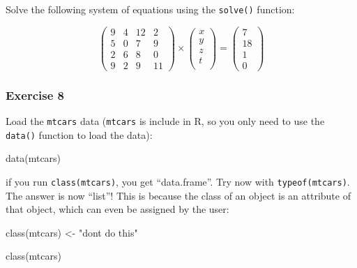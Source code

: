 \documentclass[
]{article}
\newenvironment{Shaded}{\begin{snugshade}}{\end{snugshade}}
\newcommand{\FunctionTok}[1]{\textcolor[rgb]{0.00,0.00,0.00}{#1}}
\newcommand{\NormalTok}[1]{#1}
\newcommand{\OtherTok}[1]{\textcolor[rgb]{0.56,0.35,0.01}{#1}}
\newcommand{\StringTok}[1]{\textcolor[rgb]{0.31,0.60,0.02}{#1}}
\begin{document}
Solve the following system of equations using the \texttt{solve()} function:

\[
\left(
\begin{array}{cccc}
 9 & 4 & 12 & 2 \\
 5 & 0 & 7 & 9\\
 2 & 6 & 8 & 0\\
 9 & 2 & 9 & 11
\end{array} \right) \times \left(
\begin{array}{ccc}
 x \\
 y \\
 z \\
 t \\
\end{array}\right) =
\left(
\begin{array}{ccc}
7\\
18\\
1\\
0
\end{array}
\right)
\]

\hypertarget{exercise-8}{%
\subsubsection*{Exercise 8}\label{exercise-8}}

Load the \texttt{mtcars} data (\texttt{mtcars} is include in R, so you only need to use the \texttt{data()} function to
load the data):

\begin{Shaded}
\begin{Highlighting}[]
\FunctionTok{data}\NormalTok{(mtcars)}
\end{Highlighting}
\end{Shaded}

if you run \texttt{class(mtcars)}, you get ``data.frame''. Try now with \texttt{typeof(mtcars)}. The answer is now
``list''! This is because the class of an object is an attribute of that object, which can even
be assigned by the user:

\begin{Shaded}
\begin{Highlighting}[]
\FunctionTok{class}\NormalTok{(mtcars) }\OtherTok{\textless{}{-}} \StringTok{"don\textquotesingle{}t do this"}

\FunctionTok{class}\NormalTok{(mtcars)}
\end{Highlighting}
\end{Shaded}
\end{document}
